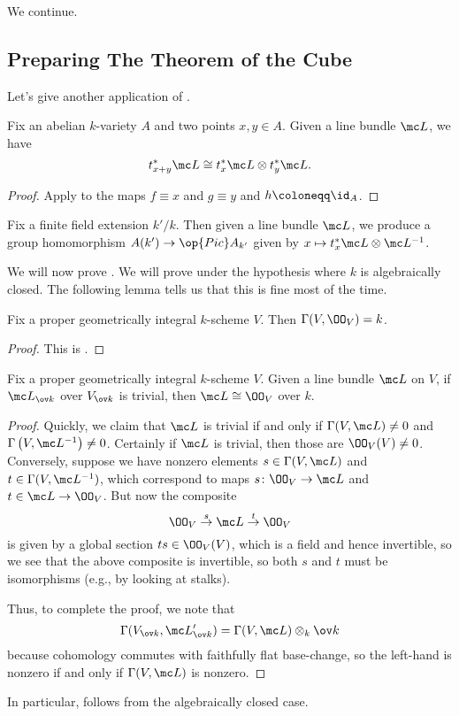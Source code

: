 \documentclass[../notes.tex]{subfiles}
\begin{document}
We continue.

\subsection{Preparing The Theorem of the Cube}
Let's give another application of .
\begin{corollary}
	Fix an abelian $k$-variety $A$ and two points $x,y\in A$. Given a line bundle $\mc L$, we have
	\[t_{x+y}^*\mc L\cong t_x^*\mc L\otimes t_y^*\mc L.\]
\end{corollary}
\begin{proof}
	Apply  to the maps $f\equiv x$ and $g\equiv y$ and $h\coloneqq\id_A$.
\end{proof}
\begin{remark}
	Fix a finite field extension $k'/k$. Then given a line bundle $\mc L$, we produce a group homomorphism $A(k')\to\op{Pic}A_{k'}$ given by $x\mapsto t_x^*\mc L\otimes\mc L^{-1}$.
\end{remark}
We will now prove . We will prove under the hypothesis where $k$ is algebraically closed. The following lemma tells us that this is fine most of the time.
\begin{lemma}
	Fix a proper geometrically integral $k$-scheme $V$. Then $\Gamma(V,\OO_V)=k$.
\end{lemma}
\begin{proof}
	This is \cite[Lemma~0BUG]{stacks}.
\end{proof}
\begin{lemma}
	Fix a proper geometrically integral $k$-scheme $V$. Given a line bundle $\mc L$ on $V$, if $\mc L_{\ov k}$ over $V_{\ov k}$ is trivial, then $\mc L\cong\OO_V$ over $k$.
\end{lemma}
\begin{proof}
	Quickly, we claim that $\mc L$ is trivial if and only if $\Gamma(V,\mc L)\ne0$ and $\Gamma\left(V,\mc L^{-1}\right)\ne0$. Certainly if $\mc L$ is trivial, then those are $\OO_V(V)\ne0$. Conversely, suppose we have nonzero elements $s\in\Gamma(V,\mc L)$ and $t\in\Gamma(V,\mc L^{-1})$, which correspond to maps $s\colon\OO_V\to\mc L$ and $t\in\mc L\to\OO_V$. But now the composite
	\[\OO_V\stackrel s\to\mc L\stackrel t\to\OO_V\]
	is given by a global section $ts\in\OO_V(V)$, which is a field and hence invertible, so we see that the above composite is invertible, so both $s$ and $t$ must be isomorphisms (e.g., by looking at stalks).

	Thus, to complete the proof, we note that
	\[\Gamma(V_{\ov k},\mc L'_{\ov k})=\Gamma(V,\mc L)\otimes_k\ov k\]
	because cohomology commutes with faithfully flat base-change, so the left-hand is nonzero if and only if $\Gamma(V,\mc L)$ is nonzero.
\end{proof}
In particular,  follows from the algebraically closed case.
\end{document}
